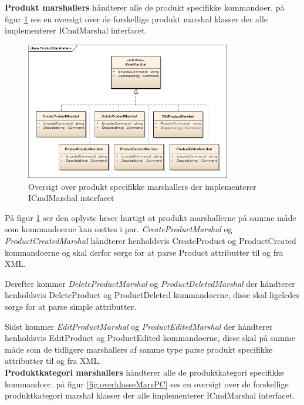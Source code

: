 \textbf{Produkt marshallers} håndterer alle de produkt specifikke kommandoer. på figur \ref{fig:overklasseMarsP} ses en oversigt over de forskellige produkt marshal klasser der alle implementerer ICmdMarshal interfacet.

\begin{figure}[H]
	\centering
	\includegraphics[width=0.8\textwidth]{Systemdesign/SharedLib/Images/Marshallers/ProductMarshallers2.png}
	\caption{Oversigt over produkt specifikke marshallers der implementerer ICmdMarshal interfacet}
	\label{fig:overklasseMarsP}
\end{figure}

På figur \ref{fig:overklasseMarsP} ser den oplyste læser hurtigt at produkt marshallerne på samme måde som kommandoerne kan sættes i par. \textit{CreateProductMarshal} og \textit{ProductCreatedMarshal} håndterer henholdsvis CreateProduct og ProductCreated kommandoerne og skal derfor sørge for at parse Product attributter til og fra XML.

Derefter kommer \textit{DeleteProductMarshal} og \textit{ProductDeletedMarshal} der håndterer henholdsvis DeleteProduct og ProductDeleted kommandoerne, disse skal ligeledes sørge for at parse simple attributter.

Sidst kommer \textit{EditProductMarshal} og \textit{ProductEditedMarshal} der håndterer henholdsvis EditProduct og ProductEdited kommandoerne, disse skal på samme måde som de tidligere marshallers af samme type parse produkt specifikke attributter til og fra XML.\\



\textbf{Produktkategori marshallers} håndterer alle de produktkategori specifikke kommandoer. på figur \ref{fig:overklasseMarsPC} ses en oversigt over de forskellige produktkategori marshal klasser der alle implementerer ICmdMarshal interfacet.

